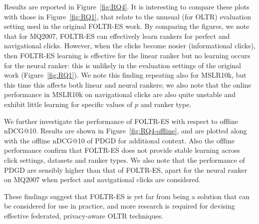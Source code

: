 Results are reported in Figure~\ref{fig:RQ4}. It is interesting to compare these plots with those in Figure~\ref{fig:RQ1}, that relate to the unusual (for OLTR) evaluation setting used in the original FOLTR-ES work. By comparing the figures, we note that for MQ2007, FOLTR-ES can effectively learn rankers for perfect and navigational clicks. However, when the clicks become nosier (informational clicks), then FOLTR-ES learning is effective for the linear ranker but no learning occurs for the neural ranker: this is unlikely in the evaluation settings of the original work (Figure~\ref{fig:RQ1}). We note this finding repeating also for MSLR10k, but this time this affects both linear and neural rankers; we also note that the online performance in MSLR10k on navigational clicks are also quite unstable and exhibit little learning for specific values of $p$ and ranker type. 


We further investigate the performance of FOLTR-ES with respect to offline nDCG@10. Results are shown in Figure~\ref{fig:RQ4-offline}, and are plotted along with the offline nDCG@10 of PDGD for additional context. Also the offline performance confirm that FOLTR-ES does not provide stable learning across click settings, datasets and ranker types. We also note that the performance of PDGD are sensibly higher than that of FOLTR-ES, apart for the neural ranker on MQ2007 when perfect and navigational clicks are considered. 

These findings suggest that FOLTR-ES is yet far from being a solution that can be considered for use in practice, and more research is required for devising effective federated, privacy-aware OLTR techniques.





